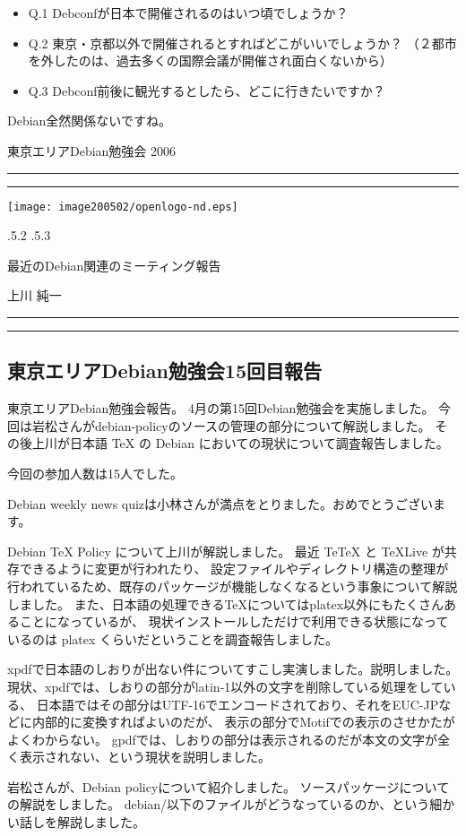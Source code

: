 \documentclass[mingoth,a4paper]{jsarticle}
\makeatletter
\renewcommand{\section}{\@startsection{section}{1}{\z@}%
    {\Cvs \@plus.5\Cdp \@minus.2\Cdp}%
    {.5\Cvs \@plus.3\Cdp}%
    {\normalfont\Large\headfont\raggedright\centering}} %
\newcommand{\dancersection}[2]{%
\newpage
東京エリアDebian勉強会 2006
\hrule
\vspace{0.5mm}
\hrule
\hfill{}\texttt{[image: image200502/openlogo-nd.eps]}\\
\vspace{-4cm}
\begin{center}
  \section{#1}
\end{center}
\hfill{}#2\hspace{3cm}\space\\
\hrule
\hrule
\vspace{1cm}
}
\makeatother
\begin{document}
\begin{itemize}
 \item  Q.1 Debconfが日本で開催されるのはいつ頃でしょうか？
 \item  Q.2 東京・京都以外で開催されるとすればどこがいいでしょうか？
 （２都市を外したのは、過去多くの国際会議が開催され面白くないから）
 \item  Q.3 Debconf前後に観光するとしたら、どこに行きたいですか？
\end{itemize}

Debian全然関係ないですね。


\dancersection{最近のDebian関連のミーティング報告}{上川 純一}

\subsection{東京エリアDebian勉強会15回目報告}
	  東京エリアDebian勉強会報告。
	  4月の第15回Debian勉強会を実施しました。
	    今回は岩松さんがdebian-policyのソースの管理の部分について解説しました。
	    その後上川が日本語 TeX の Debian においての現状について調査報告しました。
	  
	  今回の参加人数は15人でした。
        
	
	  
	    Debian weekly news quizは小林さんが満点をとりました。おめでとうございます。
	  
	  
	    Debian TeX Policy について上川が解説しました。
	    最近 TeTeX と TeXLive が共存できるように変更が行われたり、
	    設定ファイルやディレクトリ構造の整理が行われているため、既存のパッケージが機能しなくなるという事象について解説しました。
	    また、日本語の処理できるTeXについてはplatex以外にもたくさんあることになっているが、
	    現状インストールしただけで利用できる状態になっているのは platex くらいだということを調査報告しました。
	  
	  
	    xpdfで日本語のしおりが出ない件についてすこし実演しました。説明しました。
	    現状、xpdfでは、しおりの部分がlatin-1以外の文字を削除している処理をしている、
	    日本語ではその部分はUTF-16でエンコードされており、それをEUC-JPなどに内部的に変換すればよいのだが、
	    表示の部分でMotifでの表示のさせかたがよくわからない。
	    gpdfでは、しおりの部分は表示されるのだが本文の文字が全く表示されない、という現状を説明しました。
	  
	  
	    岩松さんが、Debian policyについて紹介しました。
	    ソースパッケージについての解説をしました。
	    debian/以下のファイルがどうなっているのか、という細かい話しを解説しました。
	  
\end{document}
